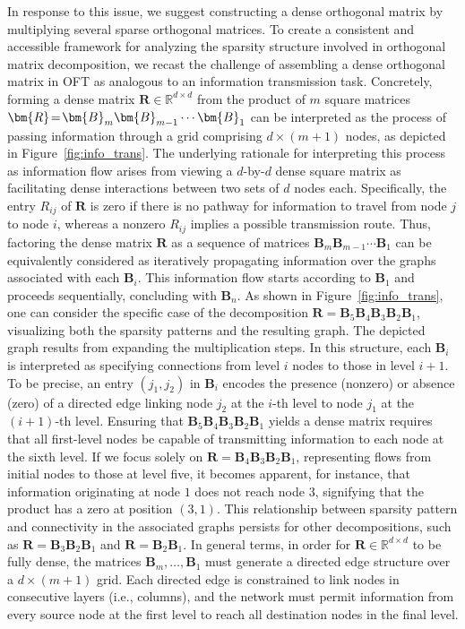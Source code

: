 In response to this issue, we suggest constructing a dense orthogonal matrix by multiplying several sparse orthogonal matrices. To create a consistent and accessible framework for analyzing the sparsity structure involved in orthogonal matrix decomposition, we recast the challenge of assembling a dense orthogonal matrix in OFT as analogous to an information transmission task. Concretely, forming a dense matrix $\bm{R}\in\mathbb{R}^{d\times d}$ from the product of $m$ square matrices $\thickmuskip=2mu \medmuskip=2mu \bm{R}=\bm{B}_m\bm{B}_{m-1}\cdots\bm{B}_1$ can be interpreted as the process of passing information through a grid comprising $d\times (m+1)$ nodes, as depicted in Figure~\ref{fig:info_trans}. The underlying rationale for interpreting this process as information flow arises from viewing a $d$-by-$d$ dense square matrix as facilitating dense interactions between two sets of $d$ nodes each. Specifically, the entry $R_{ij}$ of $\bm{R}$ is zero if there is no pathway for information to travel from node $j$ to node $i$, whereas a nonzero $R_{ij}$ implies a possible transmission route. Thus, factoring the dense matrix $\bm{R}$ as a sequence of matrices $\bm{B}_m\bm{B}_{m-1}\cdots\bm{B}_1$ can be equivalently considered as iteratively propagating information over the graphs associated with each $\bm{B}_i$. This information flow starts according to $\bm{B}_1$ and proceeds sequentially, concluding with $\bm{B}_n$. As shown in Figure~\ref{fig:info_trans}, one can consider the specific case of the decomposition $\bm{R}=\bm{B}_5\bm{B}_4\bm{B}_3\bm{B}_2\bm{B}_1$, visualizing both the sparsity patterns and the resulting graph. The depicted graph results from expanding the multiplication steps. In this structure, each $\bm{B}_i$ is interpreted as specifying connections from level $i$ nodes to those in level $i+1$. To be precise, an entry $(j_1,j_2)$ in $\bm{B}_i$ encodes the presence (nonzero) or absence (zero) of a directed edge linking node $j_2$ at the $i$-th level to node $j_1$ at the $(i+1)$-th level. Ensuring that $\bm{B}_5\bm{B}_4\bm{B}_3\bm{B}_2\bm{B}_1$ yields a dense matrix requires that all first-level nodes be capable of transmitting information to each node at the sixth level. If we focus solely on $\bm{R}=\bm{B}_4\bm{B}_3\bm{B}_2\bm{B}_1$, representing flows from initial nodes to those at level five, it becomes apparent, for instance, that information originating at node $1$ does not reach node $3$, signifying that the product has a zero at position $(3,1)$. This relationship between sparsity pattern and connectivity in the associated graphs persists for other decompositions, such as $\bm{R}=\bm{B}_3\bm{B}_2\bm{B}_1$ and $\bm{R}=\bm{B}_2\bm{B}_1$. In general terms, in order for $\bm{R}\in\mathbb{R}^{d\times d}$ to be fully dense, the matrices $\bm{B}_m,\ldots,\bm{B}_1$ must generate a directed edge structure over a $d\times (m+1)$ grid. Each directed edge is constrained to link nodes in consecutive layers (i.e., columns), and the network must permit information from every source node at the first level to reach all destination nodes in the final level.

